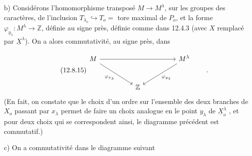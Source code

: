 b)  Considérons l'homomorphisme transposé $M \longrightarrow M^{\lambda}$, sur les groupes des caractères, de l'inclusion $T_{\lambda_{o}} \hookrightarrow T_{o} =$ tore maximal de $P_{o}$, et la forme $\varphi_{y_{\lambda}} : M^{\lambda} \longrightarrow \mathbb{Z}$, définie au signe près, définie comme dans 12.4.3 (avec $X$ remplacé par $\underline{X}^{\lambda}$). On a alors commutativité, au signe près, dans

\begin{equation}\tag{12.8.15}
\begin{tikzcd}[column sep=huge, row sep=large]
M \arrow[rr] \arrow[dr, "\varphi_{x_{\lambda}}"'] & & M^{\lambda} \arrow[dl, "\varphi_{y_{\lambda}}"] \\
 & \mathbb{Z} &
\end{tikzcd} \qquad .
\end{equation}
(En fait, on constate que le choix d'un ordre sur l'ensemble des deux branches de $X_{o}$ passant par $x_{\lambda}$ permet de faire un choix analogue en le point $y_{\lambda}$ de $\underline{X}^{\lambda}_{o}$ , et pour deux choix qui se correspondent ainsi, le diagramme précédent est commutatif.)

c)  On a commutativité dans le diagramme suivant

